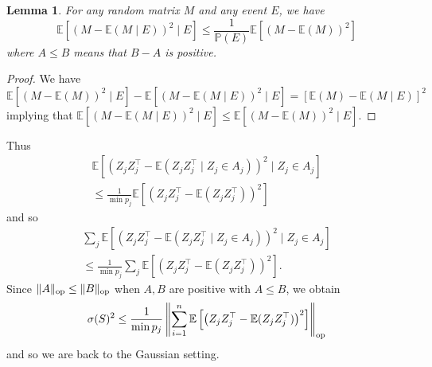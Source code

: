\documentclass[]{article}
\newcommand{\E}{\mathbb{E}}
\renewcommand{\P}{\mathbb{P}}
\newcommand{\op}{{\rm op}}
\theoremstyle{plain}
\newtheorem{lemma}{Lemma}[section]
\theoremstyle{definition}
\begin{document}
\begin{lemma}
	For any random matrix $M$ and any event $E$, we have
	\[ \E \left[ \left( M - \E(M \mid E)\right)^2 \mid E \right] \leq \frac{1}{\P(E)} \E \left[ \left( M - \E(M)\right)^2 \right] \]
	where $A \leq B$ means that $B-A$ is positive.
\end{lemma}

\begin{proof}
	We have
	\[ \E \left[ \left( M - \E(M)\right)^2 \mid E \right] - \E \left[ \left( M - \E(M \mid E)\right)^2 \mid E \right] = \left[ \E(M) - \E(M \mid E) \right]^2 \]
	implying that $\E \left[ \left( M - \E(M \mid E)\right)^2 \mid E \right] \leq \E \left[ \left( M - \E(M)\right)^2 \mid E \right]$.
\end{proof}

Thus
\begin{multline*}
	\E \left[ \left( Z_j Z_j^\top - \E(Z_j Z_j^\top \mid Z_j \in A_j) \right)^2 \mid Z_j \in A_j \right]\\
	\leq \frac{1}{\min p_j} \E \left[ \left( Z_j Z_j^\top - \E(Z_j Z_j^\top) \right)^2 \right]
\end{multline*}
and so
\begin{multline*}
	\sum_j \E \left[ \left( Z_j Z_j^\top - \E(Z_j Z_j^\top \mid Z_j \in A_j) \right)^2 \mid Z_j \in A_j \right]\\
	\leq \frac{1}{\min p_j} \sum_j \E \left[ \left( Z_j Z_j^\top - \E(Z_j Z_j^\top) \right)^2 \right].
\end{multline*}
Since $\lVert A \rVert_\op \leq \lVert B \rVert_\op$ when $A,B$ are positive with $A \leq B$, we obtain
\[ \sigma(S)^2 \leq \frac{1}{\min p_j} \left \lVert \sum_{i=1}^n \E \left[ \left( Z_j Z_j^\top - \E(Z_j Z_j^\top) \right)^2 \right] \right \rVert_\op \]
and so we are back to the Gaussian setting.
\end{document}
